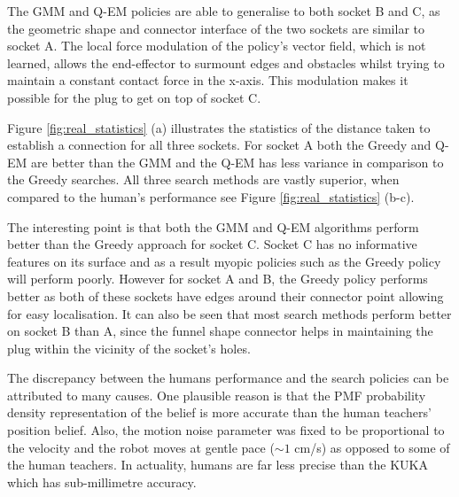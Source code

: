 \documentclass[final,5p,times,twocolumn]{elsarticle}
\begin{document}
The GMM and Q-EM policies are able to generalise to both socket B and C, as the geometric shape and connector interface of the 
two sockets are similar to socket A. The local force modulation of the policy's vector field, which is not learned, allows the 
end-effector to surmount edges and obstacles whilst trying to maintain a constant contact force in the x-axis. This modulation makes it possible for the plug to get on top of socket C.

Figure \ref{fig:real_statistics} (a) illustrates the statistics of the distance taken to establish a connection for all three sockets.
For socket A both the Greedy and Q-EM are better than the GMM and the Q-EM has less variance in comparison to the Greedy searches.  
All three search methods are vastly superior, when compared to the human's performance see Figure \ref{fig:real_statistics} (b-c).

The interesting point is that both the GMM and Q-EM algorithms perform better than the Greedy approach for socket C. Socket C has no informative 
features on its surface and as a result myopic policies such as the Greedy policy will perform poorly. However for socket A 
and B, the Greedy policy performs better as both of these sockets have edges around their connector point allowing for easy localisation. 
It can also be seen that most search methods perform better on socket B than A, since the funnel shape connector helps in maintaining the plug 
within the vicinity of the socket's holes. 

The discrepancy between the humans performance and the search policies can be attributed to many causes. One plausible reason is 
that the PMF probability density representation of the belief is more accurate than the human teachers' position belief. 
Also, the motion noise parameter was fixed to be proportional to the velocity and the robot moves at gentle pace ($\sim1$ cm/s) as 
opposed to some of the human teachers. In actuality, humans are far less precise than the KUKA which has sub-millimetre accuracy.
\end{document}
